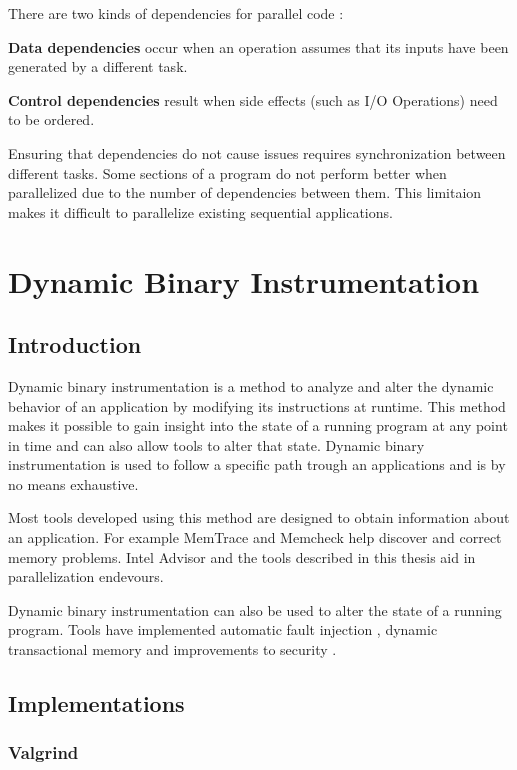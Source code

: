 There are two kinds of dependencies for parallel code \cite{parbook}:

\textbf{Data dependencies} occur when an operation assumes that its inputs have been generated by a different task.

\textbf{Control dependencies} result when side effects (such as I/O Operations) need to be ordered.

Ensuring that dependencies do not cause issues requires synchronization between different tasks. Some sections of a program do not perform better when parallelized due to the number of dependencies between them. This limitaion makes it difficult to parallelize existing sequential applications.

\section {Dynamic Binary Instrumentation}

\subsection{Introduction}

Dynamic binary instrumentation is a method to analyze and alter the dynamic behavior of an application by modifying its instructions at runtime. This method makes it possible to gain insight into the state of a running program at any point in time and can also allow tools to alter that state. Dynamic binary instrumentation is used to follow a specific path trough an applications and is by no means exhaustive.

Most tools developed using this method are designed to obtain information about an application. For example MemTrace \cite{pindoc} and Memcheck \cite{memcheck} help discover and correct memory problems. Intel Advisor \cite{inteladvisor} and the tools described in this thesis aid in parallelization endevours.

Dynamic binary instrumentation can also be used to alter the state of a running program. Tools have implemented automatic fault injection \cite{faultinject}, dynamic transactional memory \cite{dynamicstm} and improvements to security \cite{dynamicstackprotect}.

\subsection{Implementations}

\subsubsection{Valgrind}

